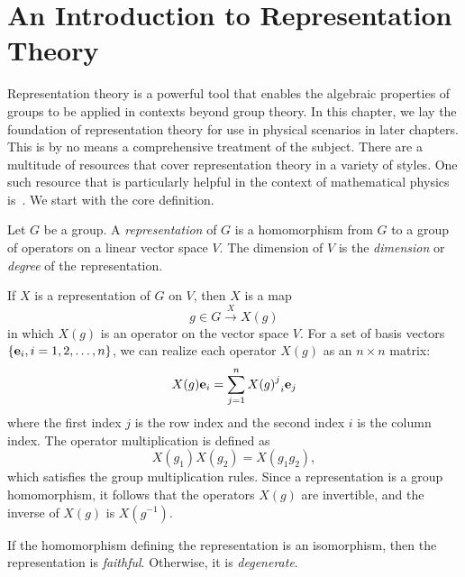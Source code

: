 \chapter{An Introduction to Representation Theory}\label{ch:rep_background}

Representation theory is a powerful tool that enables the algebraic properties of groups to be applied in contexts beyond group theory. In this chapter, we lay the foundation of representation theory for use in physical scenarios in later chapters. This is by no means a comprehensive treatment of the subject. There are a multitude of resources that cover representation theory in a variety of styles. One such resource that is particularly helpful in the context of mathematical physics is~\cite{Tung1985}. We start with the core definition.
\begin{definition}
    Let $G$ be a group. A \textit{representation} of $G$ is a homomorphism from $G$ to a group of operators on a linear vector space $V$. The dimension of $V$ is the \textit{dimension} or \textit{degree} of the representation.
\end{definition}

If $X$ is a representation of $G$ on $V$, then $X$ is a map
\begin{equation}
    g\in G\xrightarrow{X} X(g)
\end{equation}
in which $X(g)$ is an operator on the vector space $V$. For a set of basis vectors $\{\mathbf{e}_i,i=1,2,\dots,n\}$, we can realize each operator $X(g)$ as an $n\times n$ matrix:
\begin{equation}
    X(g)\e_i = \sum_{j=1}^n {{X(g)}^j}_i\e_j %
\end{equation}
where the first index $j$ is the row index and the second index $i$ is the column index.
The operator multiplication is defined as
\begin{equation}
    X(g_1)X(g_2) = X(g_1g_2),
\end{equation}
which satisfies the group multiplication rules. Since a representation is a group homomorphism, it follows that the operators $X(g)$ are invertible, and the inverse of $X(g)$ is $X(g^{-1})$.

\begin{definition}
    If the homomorphism defining the representation is an isomorphism, then the representation is \textit{faithful}. Otherwise, it is \textit{degenerate}.
\end{definition}

